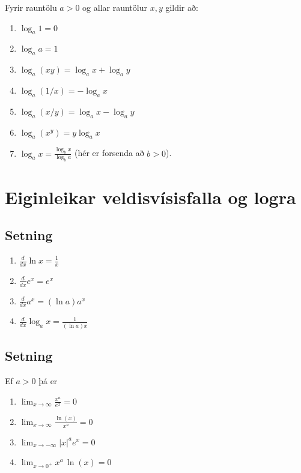 \documentclass[a4paper,10pt,icelandic]{sphinxmanual}
\begin{document}
Fyrir rauntölu \(a>0\) og allar rauntölur \(x,y\) gildir að:
\begin{enumerate}
\item {} 
\(\log_a 1=0\)

\item {} 
\(\log_a a = 1\)

\item {} 
\(\log_a(xy)=\log_a x+\log_a y\)

\item {} 
\(\log_a (1/x)=-\log_a x\)

\item {} 
\(\log_a (x/y)=\log_a x-\log_a y\)

\item {} 
\(\log_a (x^y)=y\log_a x\)

\item {} 
\(\log_a x=\frac{\log_b x}{\log_b a}\) (hér er forsenda að
\(b>0\)).

\end{enumerate}


\section{Eiginleikar veldisvísisfalla og logra}
\label{kafli04:eiginleikar-veldisvisisfalla-og-logra}

\subsection{Setning}
\label{kafli04:id5}\begin{enumerate}
\item {} 
\(\frac{d}{dx}\ln x=\frac 1x\)

\item {} 
\(\frac{d}{dx}e^x=e^x\)

\item {} 
\(\frac{d}{dx}a^x=(\ln a)a^x\)

\item {} 
\(\frac{d}{dx}\log_a x=\frac{1}{(\ln a)x}\)

\end{enumerate}


\subsection{Setning}
\label{kafli04:id6}
Ef \(a>0\) þá er
\begin{enumerate}
\item {} 
\(\lim_{x\to \infty} \frac{x^a}{e^x} = 0\)

\item {} 
\(\lim_{x\to \infty} \frac{\ln(x)}{x^a} = 0\)

\item {} 
\(\lim_{x\to -\infty} |x|^a e^x = 0\)

\item {} 
\(\lim_{x\to 0^+} x^a\, \ln(x) = 0\)

\end{enumerate}
\end{document}
